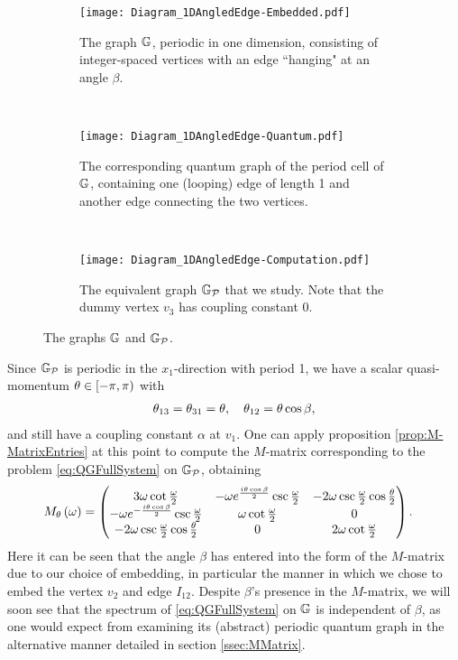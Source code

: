\begin{figure}[h!]
	\centering
	\begin{subfigure}[t]{0.3\textwidth}
		\centering
		\texttt{[image: Diagram\_1DAngledEdge-Embedded.pdf]}
		\caption{\label{fig:Diagram_1DAngledEdge-Embedded} The graph $\mathbb{G}$, periodic in one dimension, consisting of integer-spaced vertices with an edge ``hanging" at an angle $\beta$.}
	\end{subfigure}
	~
	\begin{subfigure}[t]{0.3\textwidth}
		\centering
		\texttt{[image: Diagram\_1DAngledEdge-Quantum.pdf]}
		\caption{\label{fig:Diagram_1DAngledEdge-Quantum} The corresponding quantum graph of the period cell of $\mathbb{G}$, containing one (looping) edge of length 1 and another edge connecting the two vertices.}
	\end{subfigure}
	~
	\begin{subfigure}[t]{0.3\textwidth}
		\centering
		\texttt{[image: Diagram\_1DAngledEdge-Computation.pdf]}	
		\caption{\label{fig:Diagram_1DAngledEdge-Computation} The equivalent graph $\mathbb{G}_{\mathcal{P}}$ that we study. Note that the dummy vertex $v_3$ has coupling constant 0.}
	\end{subfigure}
	\caption{\label{fig:Diagram_1DAngledEdgeExample} The graphs $\mathbb{G}$ and $\mathbb{G}_{\mathcal{P}}$.}
\end{figure} \newline

Since $\mathbb{G}_{\mathcal{P}}$ is periodic in the $x_1$-direction with period 1, we have a scalar quasi-momentum $\theta\in\left[-\pi,\pi\right)$ with
\begin{align*}
	\theta_{13} = \theta_{31} = \theta, \quad \theta_{12} = \theta\cos\beta,
\end{align*}
and still have a coupling constant $\alpha$ at $v_1$. 
One can apply proposition \ref{prop:M-MatrixEntries} at this point to compute the $M$-matrix corresponding to the problem \eqref{eq:QGFullSystem} on $\mathbb{G}_{\mathcal{P}}$, obtaining
\begin{align*}
	M_\theta\left( \omega \right) &=
	\begin{pmatrix}
		3\omega\cot\frac{\omega}{2} & -\omega e^{\frac{i\theta\cos\beta}{2}}\csc\frac{\omega}{2} & -2\omega\csc\frac{\omega}{2}\cos\frac{\theta}{2} \\
		-\omega e^{-\frac{i\theta\cos\beta}{2}}\csc\frac{\omega}{2} & \omega\cot\frac{\omega}{2} & 0 \\
		-2\omega\csc\frac{\omega}{2}\cos\frac{\theta}{2} & 0 & 2\omega\cot\frac{\omega}{2}
	\end{pmatrix}.
\end{align*}
Here it can be seen that the angle $\beta$ has entered into the form of the $M$-matrix due to our choice of embedding, in particular the manner in which we chose to embed the vertex $v_2$ and edge $I_{12}$.
Despite $\beta$'s presence in the $M$-matrix, we will soon see that the spectrum of \eqref{eq:QGFullSystem} on $\mathbb{G}$ is independent of $\beta$, as one would expect from examining its (abstract) periodic quantum graph in the alternative manner detailed in section \ref{ssec:MMatrix}. \newline


